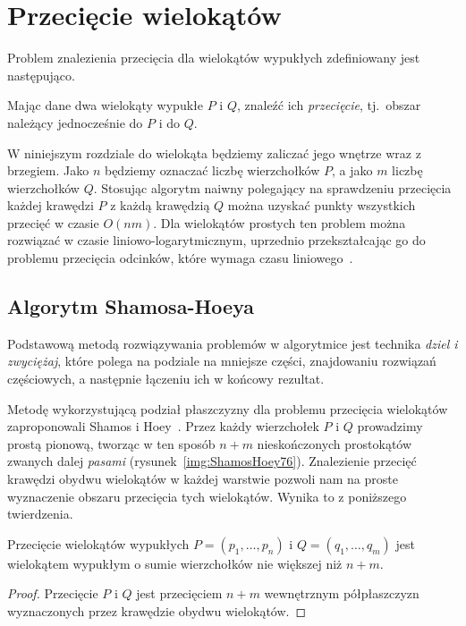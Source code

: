 \chapter{Przecięcie wielokątów}
Problem znalezienia przecięcia dla wielokątów wypukłych zdefiniowany
jest następująco.

\begin{problem}
  Mając dane dwa wielokąty wypukłe $P$ i $Q$, znaleźć ich
  \emph{przecięcie}, tj.\ obszar należący jednocześnie do $P$ i do
  $Q$.
\end{problem}

W niniejszym rozdziale do wielokąta będziemy zaliczać jego wnętrze
wraz z brzegiem. Jako $n$ będziemy oznaczać liczbę wierzchołków $P$, a
jako $m$ liczbę wierzchołków $Q$. Stosując algorytm naiwny polegający
na sprawdzeniu przecięcia każdej krawędzi $P$ z każdą krawędzią $Q$
można uzyskać punkty wszystkich przecięć w czasie $O(nm)$. Dla
wielokątów prostych ten problem można rozwiązać w czasie
liniowo-logarytmicznym, uprzednio przekształcając go do problemu
przecięcia odcinków, które wymaga czasu liniowego~\cite{Prep85}.

\section{Algorytm Shamosa-Hoeya}
Podstawową metodą rozwiązywania problemów w algorytmice jest technika
\emph{dziel i zwyciężaj}, które polega na podziale na mniejsze części,
znajdowaniu rozwiązań częściowych, a następnie łączeniu ich w końcowy
rezultat.

Metodę wykorzystującą podział płaszczyzny dla problemu przecięcia
wielokątów zaproponowali Shamos i Hoey~\cite{ShamosHoey76}. Przez
każdy wierzchołek $P$ i $Q$ prowadzimy prostą pionową, tworząc w ten
sposób $n+m$ nieskończonych prostokątów zwanych dalej \emph{pasami}
(rysunek~\ref{img:ShamosHoey76}). Znalezienie przecięć krawędzi obydwu
wielokątów w każdej warstwie pozwoli nam na proste wyznaczenie obszaru
przecięcia tych wielokątów. Wynika to z poniższego twierdzenia.

\begin{twierdzenie}
  Przecięcie wielokątów wypukłych $P = (p_1, \ldots, p_n)$ i $Q =
  (q_1, \ldots, q_m)$ jest wielokątem wypukłym o sumie wierzchołków
  nie większej niż $n + m$.
\end{twierdzenie}

\begin{proof}
  Przecięcie $P$ i $Q$ jest przecięciem $n + m$ wewnętrznym
  półpłaszczyzn wyznaczonych przez krawędzie obydwu wielokątów.
\end{proof}

